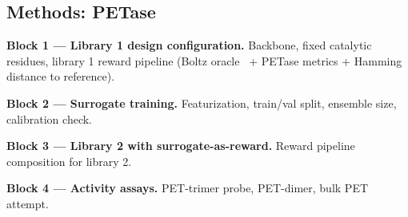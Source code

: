 \subsection{Methods: PETase}
\label{sec:met:petase}

\begin{planlist}
  \item \textbf{Block 1 --- Library 1 design configuration.} Backbone, fixed
        catalytic residues, library 1 reward pipeline (Boltz
        oracle~\cite{wohlwend2024boltz} + PETase metrics + Hamming distance to
        reference).
  \item \textbf{Block 2 --- Surrogate training.} Featurization, train/val
        split, ensemble size, calibration check.
  \item \textbf{Block 3 --- Library 2 with surrogate-as-reward.} Reward
        pipeline composition for library 2.
  \item \textbf{Block 4 --- Activity assays.} PET-trimer probe, PET-dimer,
        bulk PET attempt.
\end{planlist}
